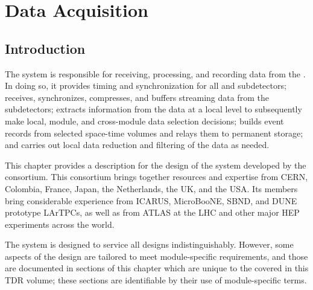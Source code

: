 \chapter{Data Acquisition}
\label{ch:sp-daq}

\section{Introduction}
\label{sec:fd-daq:introduction}

The   system is responsible for receiving,
processing, and recording data from the  . In doing so, it provides
timing and synchronization for all  and
subdetectors; receives, synchronizes, compresses, and buffers streaming
data from the subdetectors; extracts information from the data at a
local level to subsequently make local, module, and cross-module data
selection decisions; builds event records %
 from selected space-time volumes 
and relays them to permanent storage; and carries out local data
reduction and filtering of the data as needed.

This chapter provides a description for the design of the 
  system developed by the  
 consortium. 
This consortium brings together resources and expertise from CERN,
Colombia, France, Japan, the Netherlands, the UK, and the USA. 
Its members bring considerable experience from ICARUS, MicroBooNE,
SBND, and
DUNE prototype LArTPCs, as well as from ATLAS at the LHC and other major
HEP experiments across the world.

The system is designed %
to service all 
 designs indistinguishably. %
However, some aspects of the  design are tailored to meet
module-specific requirements, and those are documented in sections of this chapter which are 
unique to the  covered in this TDR volume;  
these sections are %
identifiable by their use of module-specific terms.

